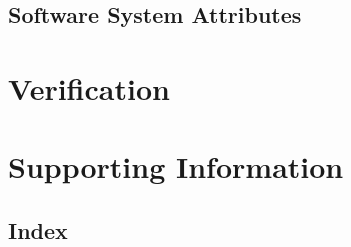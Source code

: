 \documentclass{scrreprt}
\begin{document}
\section{Software System Attributes}

\chapter{Verification}

\chapter{Supporting Information}

\begin{appendix-part}
	
\begin{appendices}
\chapter{Index} 
\end{appendices}

\end{appendix-part}
\end{document}
